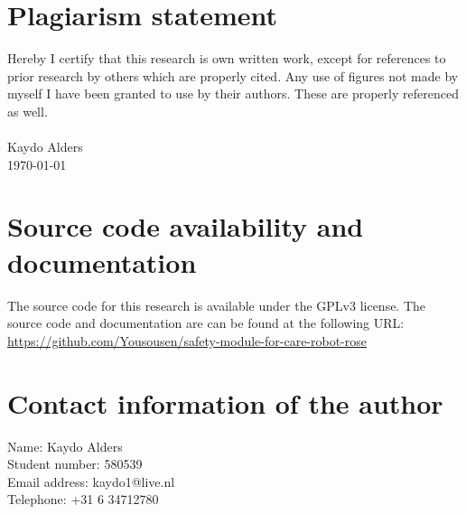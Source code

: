 \documentclass[12pt]{scrreprt}
\begin{document}
\begin{titlepage}
\vfill %
\end{titlepage}

%
%
%
%
%
%

\newpage
\mbox{}
\vfill
\section*{Plagiarism statement}
Hereby I certify that this research is own written work, except for references to prior research by others which are properly cited. Any use of figures not made by myself I have been granted to use by their authors. These are properly referenced as well.\\\\
Kaydo Alders\\
\today

\section*{Source code availability and documentation}
The source code for this research is available under the GPLv3 license. The source code and documentation are can be found at the following URL: \href{https://github.com/Yousousen/safety-module-for-care-robot-rose}{https://github.com/Yousousen/safety-module-for-care-robot-rose}

\section*{Contact information of the author}
Name: Kaydo Alders\\
Student number: 580539\\
Email address: kaydo1@live.nl\\
Telephone: +31 6 34712780\\
\end{document}
